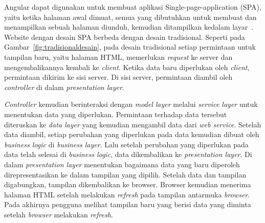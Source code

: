 Angular dapat digunakan untuk membuat aplikasi Single-page-application (SPA), yaitu ketika halaman awal dimuat, semua yang dibutuhkan untuk membuat dan menampilkan sebuah halaman diunduh, kemudian ditampilkan kedalam layar~\cite{scott:15:spa}. Website dengan desain SPA berbeda dengan desain tradisional. Seperti pada Gambar~\ref{fig:tradisionaldesain}, pada desain tradisional setiap permintaan untuk tampilan baru, yaitu halaman HTML, memerlukan \textit{request} ke server dan mengembalikannya kembali ke \textit{client}. Ketika data baru diperlukan oleh \textit{client}, permintaan dikirim ke sisi server. Di sisi server, permintaan diambil oleh \textit{controller} di dalam \textit{presentation layer}.

\textit{Controller} kemudian berinteraksi dengan \textit{model layer} melalui \textit{service layer} untuk menentukan data yang diperlukan. Permintaan terhadap data tersebut diteruskan ke \textit{data layer} yang kemudian mengambil data dari \textit{web service}. Setelah data diambil, setiap perubahan yang diperlukan pada data kemudian dibuat oleh \textit{business logic} di \textit{business layer}. Lalu setelah perubahan yang diperlukan pada data telah selesai di \textit{business logic}, data dikembalikan ke \textit{presentation layer}. Di dalam \textit{presentation layer} menentukan bagaimana data yang baru diperoleh direpresentasikan ke dalam tampilan yang dipilih. Setelah data dan tampilan digabungkan, tampilan dikembalikan ke browser. Browser kemudian menerima halaman HTML setelah melakukan \textit{refresh} pada tampilan antarmuka \textit{browser}. Pada akhirnya pengguna melihat tampilan baru yang berisi data yang diminta setelah \textit{browser} melakukan \textit{refresh}.

